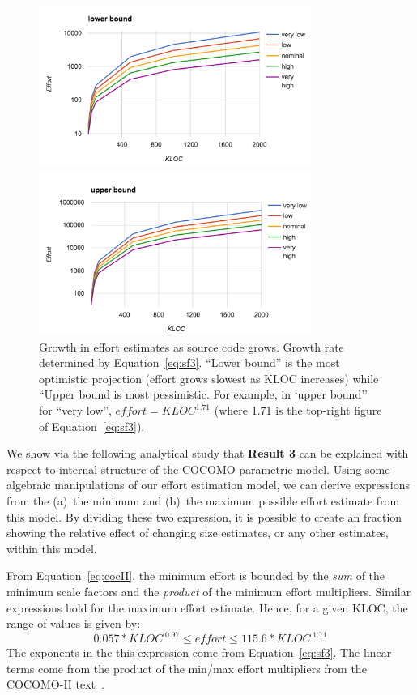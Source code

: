 \documentclass[final,twocolumn]{elsarticle}
\newcommand{\eq}[1]{Equation~\ref{eq:#1}}
\theoremstyle{break}
\begin{document}
\begin{figure}[!t] 
\includegraphics[width=3.5in]{Figs/lower.png}


\includegraphics[width=3.5in]{Figs/upper.png} 
\caption{Growth in effort estimates as source code grows. Growth rate determined by \eq{sf3}. 
``Lower bound'' is the most optimistic projection (effort grows slowest as KLOC increases)
while ``Upper bound is most pessimistic.
For example, in `upper bound'' for ``very low'', $\mathit{effort} = \mathit{KLOC}^{1.71}$ (where 1.71 is the top-right figure of \eq{sf3}). }\label{fig:lowerupper}
\end{figure}
 

We show via the following analytical study 
that {\bf Result 3} can be explained with respect to internal structure
of the COCOMO parametric model. Using some algebraic manipulations of
our effort estimation model,
we can derive expressions from
 the (a)~the minimum and (b)~the
maximum possible effort estimate from this model.
By dividing these two expression, it is possible to create an fraction showing
the relative effect of changing size estimates, or any other estimates, within this model.


From \eq{cocII},
the minimum  
effort  is bounded by the  {\em sum} of the minimum scale factors
and the {\em product} of the minimum effort multipliers.
Similar expressions hold for the  maximum effort estimate. Hence,
for a given KLOC, the range of values is given by:
\[
0.057*\mathit{KLOC}^{\;0.97}  \le \mathit{effort} \le 115.6*\mathit{KLOC}^{\;1.71}\]
The exponents in the this expression come from \eq{sf3}. The linear terms come
from the product of the min/max effort multipliers from the 
 COCOMO-II text~\cite{boehm00b}.
\end{document}
